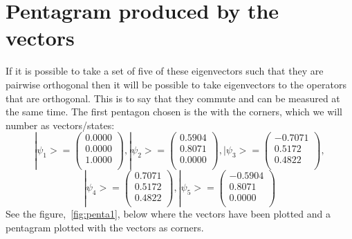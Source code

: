 \documentclass[
  utf8,%
  parskip,%
  largesmallcaps,intlimits,widermath,%
  sharecounter,nobreak,definition=marks,%
  noparts%
]{rtthesis}
\begin{document}
\section{Pentagram produced by the vectors}\label{sec:Pentagram produced by the vectors}
If it is possible to take a set of five of these eigenvectors such that they are pairwise orthogonal then it will be possible to take eigenvectors to the operators that are orthogonal. This is to say that they commute and can be measured at the same time. The first pentagon chosen is the with the corners, which we will number as vectors/states:\\
\begin{equation*}
|\psi_1>=
\begin{pmatrix}
0.0000\\
0.0000\\
1.0000\\
\end{pmatrix}
,
|\psi_2>=
\begin{pmatrix}
0.5904\\
0.8071\\
0.0000\\
\end{pmatrix}
,
|\psi_3>=
\begin{pmatrix}
-0.7071\\
0.5172\\
0.4822\\
\end{pmatrix}
,
\end{equation*}
\begin{equation*}
|\psi_4>=
\begin{pmatrix}
0.7071\\
0.5172\\
0.4822\\
\end{pmatrix}
,
|\psi_5>=
\begin{pmatrix}
-0.5904\\
0.8071\\
0.0000\\
\end{pmatrix}
\end{equation*}
See the figure,~\ref{fig:penta1}, below where the vectors have been plotted and a pentagram plotted with the vectors as corners.
\end{document}
